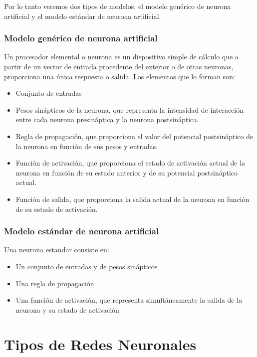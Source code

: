 \documentclass[11pt, oneside]{article}   	%
\begin{document}
Por lo tanto veremos dos tipos de modelos, el modelo genérico de neurona artificial y el modelo estándar de neurona artificial.

\subsubsection{Modelo genérico de neurona artificial}

Un procesador elemental o neurona es un dispositivo simple de cálculo que a partir de un vector de entrada procedente del exterior o de otras neuronas, proporciona una única respuesta o salida. Los elementos que lo forman son:

\begin{itemize}
\item Conjunto de entradas
\item Pesos sinápticos de la neurona, que representa la intensidad de interacción entre cada neurona presináptica y la neurona postsináptica.
\item Regla de propagación, que proporciona el valor del potencial postsináptico de la neurona en función de sus pesos y entradas.
\item Función de activación, que proporciona el estado de activación actual de la neurona en función de su estado anterior y de su potencial postsináptico actual.
\item Función de salida, que proporciona la salida actual de la neurona en función de su estado de activación.
\end{itemize}

\subsubsection{Modelo estándar de neurona artificial}

Una neurona estandar consiste en:

\begin{itemize}
\item Un conjunto de entradas y de pesos sinápticos
\item Una regla de propagación
\item Una función de activación, que representa simultáneamente la salida de la neurona y su estado de activación
\end{itemize}

\section{Tipos de Redes Neuronales}
\end{document}
